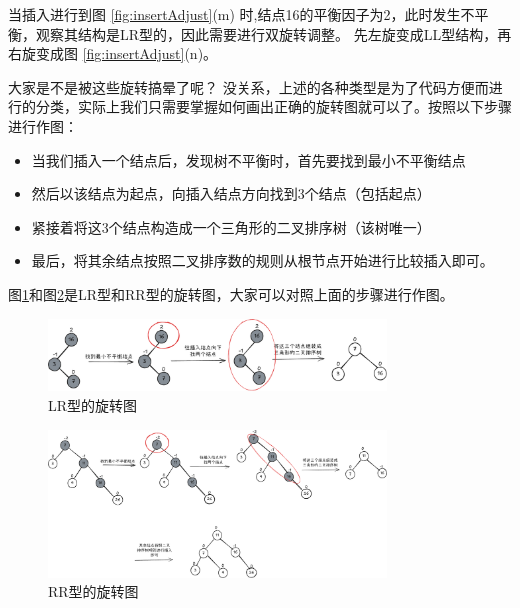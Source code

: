 \documentclass[lang=cn,newtx,10pt,scheme=chinese]{elegantbook}
\begin{document}
当插入进行到图 \ref{fig:insertAdjust}(m) 时,结点16的平衡因子为2，此时发生不平衡，观察其结构是LR型的，因此需要进行双旋转调整。
先左旋变成LL型结构，再右旋变成图 \ref{fig:insertAdjust}(n)。


大家是不是被这些旋转搞晕了呢？
没关系，上述的各种类型是为了代码方便而进行的分类，实际上我们只需要掌握如何画出正确的旋转图就可以了。按照以下步骤进行作图：

\begin{itemize}
  \item 当我们插入一个结点后，发现树不平衡时，首先要找到最小不平衡结点
  \item 然后以该结点为起点，向插入结点方向找到3个结点（包括起点）
  \item 紧接着将这3个结点构造成一个三角形的二叉排序树（该树唯一）
  \item 最后，将其余结点按照二叉排序数的规则从根节点开始进行比较插入即可。
\end{itemize}

图\ref{fig:banlanceTree_insert_LR}和图\ref{fig:banlanceTree_insert_RR}是LR型和RR型的旋转图，大家可以对照上面的步骤进行作图。
\begin{figure}
  
    \centering
    \includegraphics[width=0.8\textwidth]{./figure/pdf/cropped/balanceTree_insert_LR.pdf}
    \caption{LR型的旋转图}
    \label{fig:banlanceTree_insert_LR}
\end{figure}

\begin{figure}
  
    \centering
    \includegraphics[width=0.8\textwidth]{./figure/pdf/cropped/balanceTree_insert_RR.pdf}
    \caption{RR型的旋转图}
    \label{fig:banlanceTree_insert_RR}

\end{figure}
\end{document}
